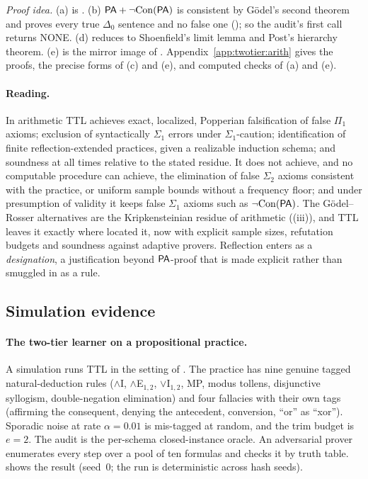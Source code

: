 \noindent\emph{Proof idea.} (a) is . (b) $\mathsf{PA}+\neg\mathrm{Con}(\mathsf{PA})$ is consistent by G\"odel's second theorem \citep{godel1931formal} and proves every true $\Delta_0$ sentence and no false one (); so the audit's first call returns NONE. (d) reduces to Shoenfield's limit lemma \citep{shoenfield1959degrees} and Post's hierarchy theorem. (e) is the mirror image of . Appendix~\ref{app:twotier:arith} gives the proofs, the precise forms of (c) and (e), and computed checks of (a) and (e).

\paragraph{Reading.} In arithmetic TTL achieves exact, localized, Popperian falsification of false $\Pi_1$ axioms; exclusion of syntactically $\Sigma_1$ errors under $\Sigma_1$-caution; identification of finite reflection-extended practices, given a realizable induction schema; and soundness at all times relative to the stated residue. It does not achieve, and no computable procedure can achieve, the elimination of false $\Sigma_2$ axioms consistent with the practice, or uniform sample bounds without a frequency floor; and under presumption of validity it keeps false $\Sigma_1$ axioms such as $\neg\mathrm{Con}(\mathsf{PA})$. The G\"odel--Rosser alternatives are the Kripkensteinian residue of arithmetic ((iii)), and TTL leaves it exactly where  located it, now with explicit sample sizes, refutation budgets and soundness against adaptive provers. Reflection enters as a \emph{designation}, a justification beyond $\mathsf{PA}$-proof that is made explicit rather than smuggled in as a rule.

\subsection{Simulation evidence}\label{sec:twotier:sim}

\paragraph{The two-tier learner on a propositional practice.} A simulation runs TTL in the setting of . The practice has nine genuine tagged natural-deduction rules ($\wedge$I, $\wedge$E$_{1,2}$, $\vee$I$_{1,2}$, MP, modus tollens, disjunctive syllogism, double-negation elimination) and four fallacies with their own tags (affirming the consequent, denying the antecedent, conversion, ``or'' as ``xor''). Sporadic noise at rate $\alpha=0.01$ is mis-tagged at random, and the trim budget is $e=2$. The audit is the per-schema closed-instance oracle. An adversarial prover enumerates every step over a pool of ten formulas and checks it by truth table.  shows the result (seed~0; the run is deterministic across hash seeds).

